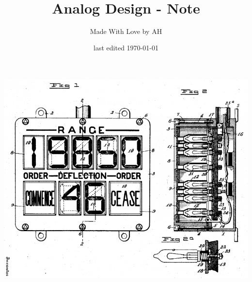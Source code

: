 \documentclass{article}
\title{Analog Design - Note }
\author{Made With Love by AH}
\date{last edited \today}
\begin{document}

\makeatletter
    \begin{titlepage}
        \begin{center}
            \includegraphics[width=0.7\linewidth]{logo.png}\\[4ex]
            {\huge \bfseries  \@title }\\[2ex] 
            {\LARGE  \@author}\\[50ex] 
            {\large \@date}
        \end{center}
    \end{titlepage}
\makeatother

\maketitle
\tableofcontents
\pagebreak


\end{document}

